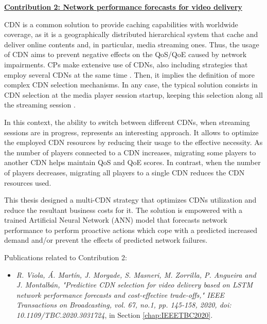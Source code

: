 \textbf{\underline{Contribution 2: Network performance forecasts for video delivery}}
\label{contribution:2}

CDN is a common solution to provide caching capabilities with worldwide coverage, as it is a geographically distributed hierarchical system that cache and deliver online contents and, in particular, media streaming ones. Thus, the usage of CDN aims to prevent negative effects on the QoS/QoE caused by network impairments. CPs make extensive use of CDNs, also including strategies that employ several CDNs at the same time \cite{adhikari2012, adhikari2012-2}. Then, it implies the definition of more complex CDN selection mechanisms. In any case, the typical solution consists in CDN selection at the media player session startup, keeping this selection along all the streaming session \cite{adhikari2015}.

In this context, the ability to switch between different CDNs, when streaming sessions are in progress, represents an interesting approach. It allows to optimize the employed CDN resources by reducing their usage to the effective necessity. As the number of players connected to a CDN increases, migrating some players to another CDN helps maintain QoS and QoE scores. In contrast, when the number of players decreases, migrating all players to a single CDN reduces the CDN resources used.

This thesis designed a multi-CDN strategy that optimizes CDNs utilization and reduce the resultant business costs for it. The solution is empowered with a trained Artificial Neural Network (ANN) model that forecasts network performance to perform proactive actions which cope with a predicted increased demand and/or prevent the effects of predicted network failures.

Publications related to Contribution 2:
\begin{itemize}
	\item \textit{R. Viola, \'A. Mart\'in, J. Morgade, S. Masneri, M. Zorrilla, P. Angueira and J. Montalb\'an, "Predictive CDN selection for video delivery based on LSTM network performance forecasts and cost-effective trade-offs," IEEE Transactions on Broadcasting, vol. 67, no.1, pp. 145-158, 2020, doi: 10.1109/TBC.2020.3031724}, in Section \ref{chap:IEEETBC2020}.
\end{itemize}


